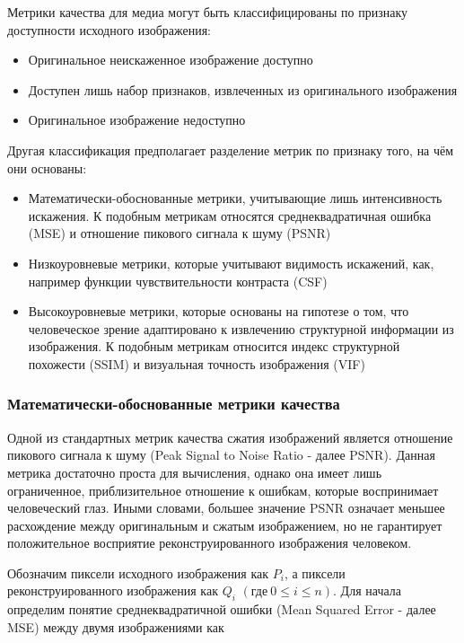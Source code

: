 Метрики качества для медиа могут быть классифицированы по признаку доступности
исходного изображения\cite{SSIMArticle}:

\begin{itemize}
    \item Оригинальное неискаженное изображение доступно
    \item Доступен лишь набор признаков, извлеченных из оригинального изображения
    \item Оригинальное изображение недоступно
\end{itemize}

Другая классификация предполагает разделение метрик по признаку того, на чём они
основаны\cite[6]{FullReferenceIQMetrics}:

\begin{itemize}
    \item Математически-обоснованные метрики, учитывающие лишь интенсивность
    искажения. К подобным метрикам относятся среднеквадратичная ошибка (MSE) и
    отношение пикового сигнала к шуму (PSNR)
    \item Низкоуровневые метрики, которые учитывают видимость искажений, как,
    например функции чувствительности контраста (CSF)
    \item Высокоуровневые метрики, которые основаны на гипотезе о том, что
    человеческое зрение адаптировано к извлечению структурной информации из
    изображения. К подобным метрикам относится индекс структурной похожести
    (SSIM) и визуальная точность изображения (VIF)
\end{itemize}

\subsubsection{Математически-обоснованные метрики качества}

Одной из стандартных метрик качества сжатия изображений является отношение
пикового сигнала к шуму (Peak Signal to Noise Ratio - далее PSNR). Данная
метрика достаточно проста для вычисления, однако она имеет лишь ограниченное,
приблизительное отношение к ошибкам, которые воспринимает человеческий глаз.
Иными словами, большее значение PSNR означает меньшее расхождение между
оригинальным и сжатым изображением, но не гарантирует положительное восприятие
реконструированного изображения человеком\cite[279]{DataCompression}.

Обозначим пиксели исходного изображения как $P_{i}$, а пиксели
реконструированного изображения как $Q_{i}$ $\left(\text{где} \ 0 \le i \le
n\right)$. Для начала определим понятие среднеквадратичной ошибки (Mean Squared
Error - далее MSE) между двумя изображениями как

